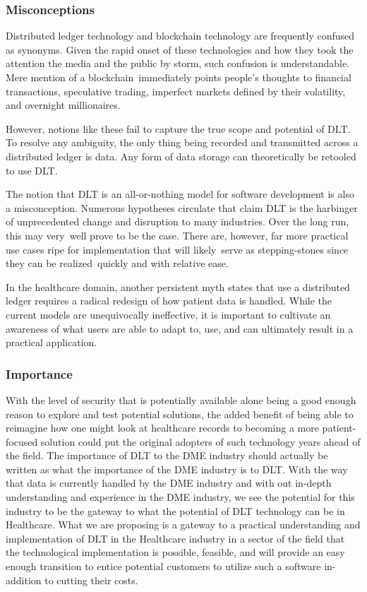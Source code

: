 \documentclass[preprint,pre,floats,aps,amsmath,amssymb]{revtex4-1}
\begin{document}
  \subsubsection{Misconceptions}
  Distributed ledger technology and blockchain technology are frequently confused as synonyms. Given the rapid onset of these technologies and how they took the attention the media and the public by storm, such confusion is understandable. Mere mention of a blockchain immediately points people's thoughts to financial transactions, speculative trading, imperfect markets defined by their volatility, and overnight millionaires.

  However, notions like these fail to capture the true scope and potential of DLT. To resolve any ambiguity, the only thing being recorded and transmitted across a distributed ledger is data. Any form of data storage can theoretically be retooled to use DLT. 

  The notion that DLT is an all-or-nothing model for software development is also a misconception. Numerous hypotheses circulate that claim DLT is the harbinger of unprecedented change and disruption to many industries. Over the long run, this may very well prove to be the case. There are, however, far more practical use cases ripe for implementation that will likely serve as stepping-stones since they can be realized quickly and with relative ease.

  In the healthcare domain, another persistent myth states that use a distributed ledger requires a radical redesign of how patient data is handled. While the current models are unequivocally ineffective, it is important to cultivate an awareness of what users are able to adapt to, use, and can ultimately result in a practical application.

  \subsubsection{Importance}
  With the level of security that is potentially available alone being a good enough reason to explore and test potential solutions, the added benefit of being able to reimagine how one might look at healthcare records to becoming a more patient-focused solution could put the original adopters of such technology years ahead of the field. The importance of DLT to the DME industry should actually be written as what the importance of the DME industry is to DLT. With the way that data is currently handled by the DME industry and with out in-depth understanding and experience in the DME industry, we see the potential for this industry to be the gateway to what the potential of DLT technology can be in Healthcare. What we are proposing is a gateway to a practical understanding and implementation of DLT in the Healthcare industry in a sector of the field that the technological implementation is possible, feasible, and will provide an easy enough transition to entice potential customers to utilize such a software in-addition to cutting their costs.
\end{document}
